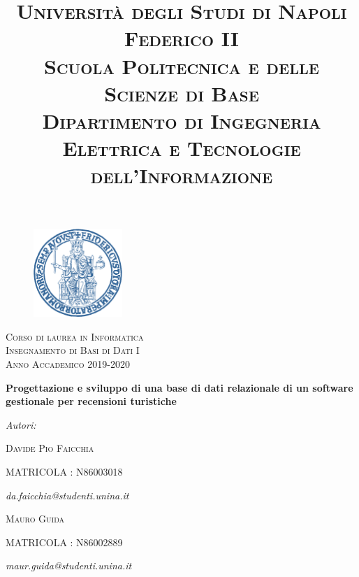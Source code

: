\documentclass[a4paper,12pt]{article}
\begin{document}
\title { \large \textsc{Università degli Studi di Napoli Federico II \\
		 Scuola Politecnica e delle Scienze di Base} \\
\textsc{Dipartimento di Ingegneria Elettrica e Tecnologie dell’Informazione}}

\author{}
\date{}
\maketitle 
\thispagestyle{empty}

\vspace*{-2cm}
\begin{center}
	\begin{figure}[h]
	\centering
 	\includegraphics[width=0.3\textwidth]{unina_logo.png}
	\end{figure}
	
	\Large \textsc{Corso di laurea in Informatica \\
		   Insegnamento di Basi di Dati I\\
		   Anno Accademico 2019-2020}
\end{center}

\vspace*{+1.5cm}
\begin{center}
\Huge \bf Progettazione e sviluppo di una base di dati relazionale di un software gestionale per recensioni turistiche
\end{center}


\vspace*{-2cm}
\vfill 
\begin{flushleft}
\textit{Autori:}


\normalsize{\textsc{Davide Pio Faicchia} 


\textsc{MATRICOLA : N86003018 }


\textit{da.faicchia@studenti.unina.it}}
\end{flushleft}


\begin{flushleft}
\normalsize{\textsc{Mauro Guida}


\textsc{MATRICOLA : N86002889}


\textit{maur.guida@studenti.unina.it}}
\end{flushleft}
\end{document}
